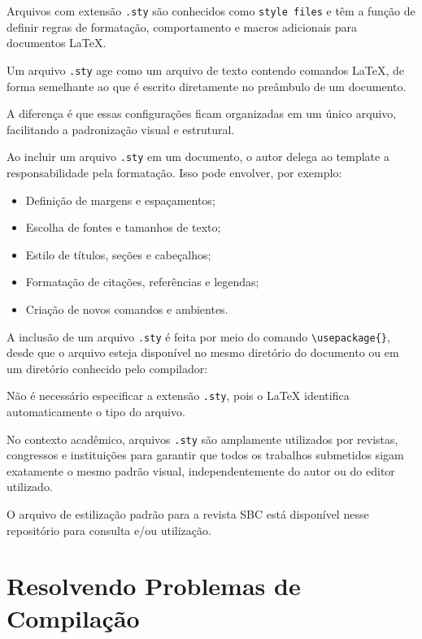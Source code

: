 \documentclass{article}
\begin{document}
Arquivos com extensão \texttt{.sty} são conhecidos como \texttt{style files} e têm a função de definir regras de formatação, comportamento e macros adicionais para documentos \LaTeX.

Um arquivo \texttt{.sty} age como um arquivo de texto contendo comandos \LaTeX, de forma semelhante ao que é escrito diretamente no preâmbulo de um documento.

A diferença é que essas configurações ficam organizadas em um único arquivo, facilitando a padronização visual e estrutural.

Ao incluir um arquivo \texttt{.sty} em um documento, o autor delega ao template a responsabilidade pela formatação. Isso pode envolver, por exemplo:
\begin{itemize}
	\item Definição de margens e espaçamentos;
	\item Escolha de fontes e tamanhos de texto;
	\item Estilo de títulos, seções e cabeçalhos;
	\item Formatação de citações, referências e legendas;
	\item Criação de novos comandos e ambientes.	
\end{itemize}

A inclusão de um arquivo \texttt{.sty} é feita por meio do comando \texttt{\textbackslash usepackage\{\}}, desde que o arquivo esteja disponível no mesmo diretório do documento ou em um diretório conhecido pelo compilador:

\begin{teX}
	\usepackage{nomedoestilo}
\end{teX}

Não é necessário especificar a extensão \texttt{.sty}, pois o \LaTeX\hspace{1pt} identifica automaticamente o tipo do arquivo.

No contexto acadêmico, arquivos \texttt{.sty} são amplamente utilizados por revistas, congressos e instituições para garantir que todos os trabalhos submetidos sigam exatamente o mesmo padrão visual, independentemente do autor ou do editor utilizado.

O arquivo de estilização padrão para a revista SBC está disponível nesse repositório para consulta e/ou utilização.

\section{Resolvendo Problemas de Compilação}
\end{document}
